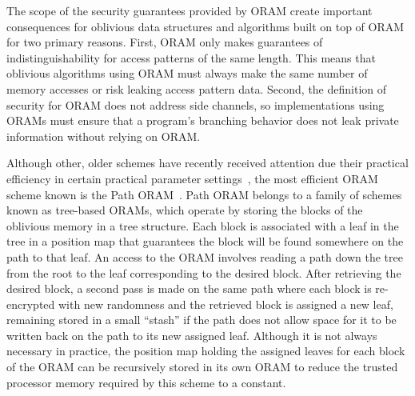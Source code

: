 \documentclass[letterpaper,twocolumn,10pt]{article}
\begin{document}
The scope of the security guarantees provided by ORAM create important consequences for oblivious data structures and algorithms built on top of ORAM for two primary reasons. First, ORAM only makes guarantees of indistinguishability for access patterns of the same length. This means that oblivious algorithms using ORAM must always make the same number of memory accesses or risk leaking access pattern data. Second, the definition of security for ORAM does not address side channels, so implementations using ORAMs must ensure that a program's branching behavior does not leak private information without relying on ORAM.

Although other, older schemes have recently received attention due their practical efficiency in certain practical parameter settings~\cite{ZWR+16}, the most efficient ORAM scheme known is the Path ORAM~\cite{SDS+13}. Path ORAM belongs to a family of schemes known as tree-based ORAMs, which operate by storing the blocks of the oblivious memory in a tree structure. Each block is associated with a leaf in the tree in a position map that guarantees the block will be found somewhere on the path to that leaf. An access to the ORAM involves reading a path down the tree from the root to the leaf corresponding to the desired block. After retrieving the desired block, a second pass is made on the same path where each block is re-encrypted with new randomness and the retrieved block is assigned a new leaf, remaining stored in a small ``stash'' if the path does not allow space for it to be written back on the path to its new assigned leaf. Although it is not always necessary in practice, the position map holding the assigned leaves for each block of the ORAM can be recursively stored in its own ORAM to reduce the trusted processor memory required by this scheme to a constant.
\end{document}
